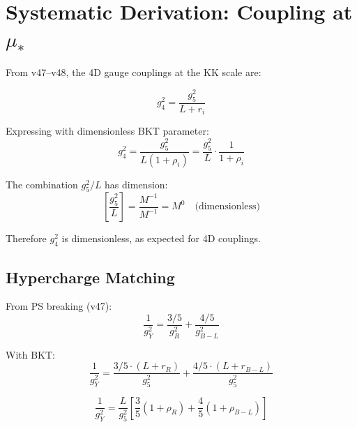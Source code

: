 \documentclass[11pt,a4paper]{article}
\theoremstyle{definition}
\begin{document}
\section{Systematic Derivation: Coupling at $\mu_*$}
\label{sec:coupling_derivation}

From v47--v48, the 4D gauge couplings at the KK scale are:

\begin{equation}
\label{eq:g4_from_g5}
g_4^2 = \frac{g_5^2}{L + r_i}
\end{equation}

Expressing with dimensionless BKT parameter:
\begin{equation}
\label{eq:g4_rho}
g_4^2 = \frac{g_5^2}{L(1 + \rho_i)} = \frac{g_5^2}{L} \cdot \frac{1}{1 + \rho_i}
\end{equation}

The combination $g_5^2/L$ has dimension:
\begin{equation}
\label{eq:g5_L_dim}
\left[\frac{g_5^2}{L}\right] = \frac{M^{-1}}{M^{-1}} = M^0 \quad \text{(dimensionless)}
\end{equation}

Therefore $g_4^2$ is dimensionless, as expected for 4D couplings.

\subsection{Hypercharge Matching}
\label{subsec:hypercharge}

From PS breaking (v47):
\begin{equation}
\label{eq:gY_matching}
\frac{1}{g_Y^2} = \frac{3/5}{g_R^2} + \frac{4/5}{g_{B-L}^2}
\end{equation}

With BKT:
\begin{equation}
\label{eq:gY_bkt}
\frac{1}{g_Y^2} = \frac{3/5 \cdot (L + r_R)}{g_5^2} + \frac{4/5 \cdot (L + r_{B-L})}{g_5^2}
\end{equation}

\begin{equation}
\label{eq:gY_bkt_rho}
\frac{1}{g_Y^2} = \frac{L}{g_5^2}\left[\frac{3}{5}(1 + \rho_R) + \frac{4}{5}(1 + \rho_{B-L})\right]
\end{equation}
\end{document}
